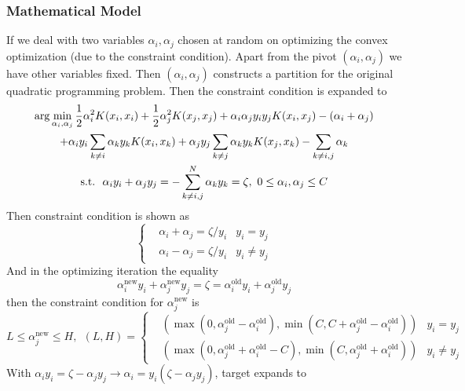 \documentclass[12pt]{article}
\newcommand{\new}{\text{new}}
\newcommand{\old}{\text{old}}
\begin{document}
\subsubsection{Mathematical Model}
If we deal with two variables $\alpha_i, \alpha_j$ chosen at random on optimizing the convex optimization (due to the constraint condition). Apart from the pivot $(\alpha_i, \alpha_j)$ we have other variables fixed. Then $(\alpha_i, \alpha_j)$ constructs a partition for the original quadratic programming problem.
Then the constraint condition is expanded to
\begin{gather}
    \arg \min_{\alpha_i, \alpha_j} \frac{1}{2} \alpha_i^2 K(x_i, x_i) + \frac{1}{2}\alpha_j^2 K(x_j, x_j) + \alpha_i\alpha_j y_i y_j K(x_i, x_j) - (\alpha_i + \alpha_j) \notag \\ + \alpha_i y_i \sum_{k\neq i} \alpha_k y_k K(x_i, x_k) + \alpha_j y_j \sum_{k\neq j}
    \alpha_k y_k K(x_j, x_k) - \sum_{k\neq i, j} \alpha_k \\
    \text{s.t.}~~\alpha_iy_i + \alpha_jy_j = -\sum_{k \neq i,j}^N \alpha_k y_k =   \zeta,~0 \leq \alpha_i, \alpha_j \leq C
\end{gather}
Then constraint condition is shown as
\begin{equation}
    \left\{ \begin{aligned}
        &\alpha_i + \alpha_j = \zeta / y_i &y_i = y_j \\
        &\alpha_i - \alpha_j = \zeta / y_i &y_i \neq y_j
    \end{aligned} \right.
\end{equation}
And in the optimizing iteration the equality
\begin{equation}
    \alpha_i^{\new}y_i + \alpha_j^{\new}y_j = \zeta = \alpha_i^{\old}y_i + \alpha_j^{\old}y_j
\end{equation}
then the constraint condition for $\alpha_j^{\new}$ is
\begin{equation}
    L \leq \alpha_j^{\new} \leq H,~~(L, H) = \left\{ \begin{aligned}
        &\left( \max(0, \alpha_j^{\old} - \alpha_i^{\old}), \min(C, C+\alpha_j^{\old} - \alpha_i^{\old}) \right) &y_i = y_j \\
        &\left( \max(0, \alpha_j^{\old} + \alpha_i^{\old} - C), \min(C, \alpha_j^{\old} + \alpha_i^{\old})\right) &y_i \neq y_j
    \end{aligned} \right.
\end{equation}
With $\alpha_iy_i = \zeta - \alpha_jy_j \rightarrow \alpha_i = y_i(\zeta - \alpha_jy_j)$, target expands to
\end{document}
